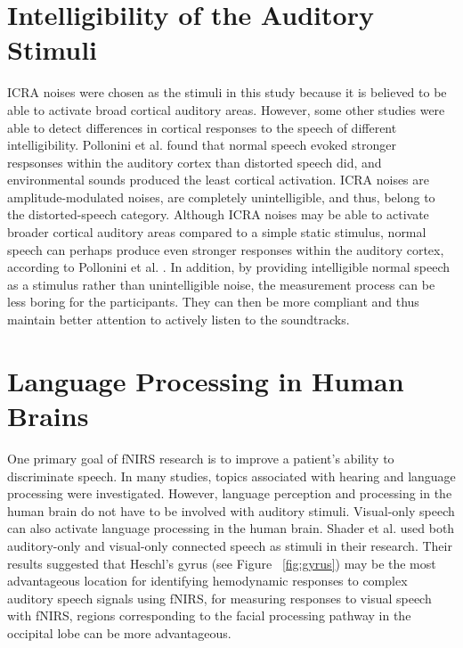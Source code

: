 \section{Intelligibility of the Auditory Stimuli}
ICRA noises were chosen as the stimuli in this study because it is believed to be able to activate broad cortical auditory areas. However, some other studies were able to detect differences in cortical responses to the speech of different intelligibility. Pollonini et al. \citeyearpar{Pollonini2013} found that normal speech evoked stronger respsonses within the auditory cortex than distorted speech did, and environmental sounds produced the least cortical activation. ICRA noises are amplitude-modulated noises, are completely unintelligible, and thus, belong to the distorted-speech category. Although ICRA noises may be able to activate broader cortical auditory areas compared to a simple static stimulus, normal speech can perhaps produce even stronger responses within the auditory cortex, according to Pollonini et al. \citeyearpar{Pollonini2013}. In addition, by providing intelligible normal speech as a stimulus rather than unintelligible noise, the measurement process can be less boring for the participants. They can then be more compliant and thus maintain better attention to actively listen to the soundtracks.

\section{Language Processing in Human Brains}
One primary goal of fNIRS research is to improve a patient's ability to discriminate speech. In many studies, topics associated with hearing and language processing were investigated. However, language perception and processing in the human brain do not have to be involved with auditory stimuli. Visual-only speech can also activate language processing in the human brain. Shader et al. \citeyearpar{Shader2021} used both auditory-only and visual-only connected speech as stimuli in their research. Their results suggested that Heschl's gyrus (see Figure ~\ref{fig:gyrus}) may be the most advantageous location for identifying hemodynamic responses to complex auditory speech signals using fNIRS, for measuring responses to visual speech with fNIRS, regions corresponding to the facial processing pathway in the occipital lobe can be more advantageous.

